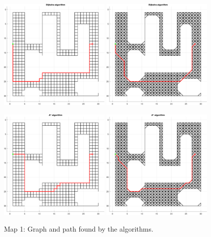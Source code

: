 \begin{figure}[H]
    \centering
    \includegraphics[width=0.48\textwidth]{./img/MATLAB/01_dijkstra_orthogonal.pdf}
    \hspace{6pt}
    \includegraphics[width=0.48\textwidth]{./img/MATLAB/01_dijkstra_diagonal.pdf}

    \vspace{11pt}

    \includegraphics[width=0.48\textwidth]{./img/MATLAB/01_astar_orthogonal.pdf}
    \hspace{6pt}
    \includegraphics[width=0.48\textwidth]{./img/MATLAB/01_astar_diagonal.pdf}
    \caption{Map 1: Graph and path found by the algorithms.}
    \label{fig:map_1_results}
\end{figure}

